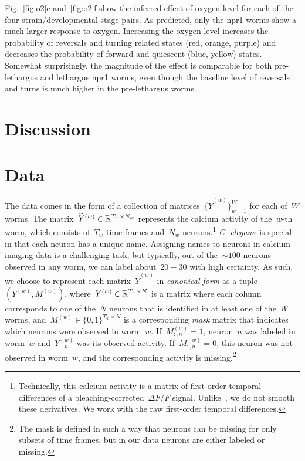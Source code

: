 \documentclass[11pt]{article}
\newcommand{\celegans}{\textit{C. elegans}}
\begin{document}
Fig.~\ref{fig:o2}e and~\ref{fig:o2}f show the inferred effect of
oxygen level for each of the four strain/developmental stage pairs.
As predicted, only the npr1 worms show a much larger response to
oxygen. Increasing the oxygen level increases the probability
of reversals and turning related states (red, orange, purple) and
decreases the probability of forward and quiescent (blue, yellow)
states. Somewhat surprisingly, the magnitude of the effect is
comparable for both pre-lethargus and lethargus npr1 worms, even
though the baseline level of reversals and turns is much higher in
the pre-lethargus worms. 

\clearpage

\section*{Discussion}

\clearpage




\clearpage

\appendix

\section{Data}
\label{sec:data}

The data comes in the form of a collection of matrices~$\{\widetilde{Y}^{(w)}\}_{w=1}^W$
for each of~$W$ worms.  The matrix~${\widetilde{Y}^{(w)} \in \mathbb{R}^{T_w \times N_w}}$
represents the calcium activity of the~$w$-th worm, which consists of~$T_w$
time frames and~$N_w$ neurons.\footnote{Technically, this calcium activity is
a matrix of first-order temporal differences of a
bleaching-corrected~$\Delta F /F$ signal. Unlike~\citet{kato2015global}, we
do not smooth these derivatives. We work with the raw first-order
temporal differences.}  \celegans~is special in that each neuron has a unique
name.  Assigning names to neurons in calcium imaging data is a challenging
task, but typically, out of the~${\sim 100}$ neurons observed in any worm,
we can label about~$20-30$ with high certainty.  As such, we choose to
represent each matrix~$\widetilde{Y}^{(w)}$ in \emph{canonical form} as a
tuple~$(Y^{(w)}, M^{(w)})$, where~${Y^{(w)} \in \mathbb{R}^{T_w \times N}}$ is
a matrix where each column corresponds to one of the~$N$ neurons that is
identified in at least one of the~$W$ worms, and~${M^{(w)} \in \{0,1\}^{T_w \times N}}$
is a corresponding \emph{mask} matrix that indicates which neurons were
observed in worm~$w$.  If~$M_{:,n}^{(w)} = 1$, neuron~$n$ was labeled in
worm~$w$ and~$Y_{:,n}^{(w)}$ was its observed activity.  If~$M_{:,n}^{(w)}=0$,
this neuron was not observed in worm~$w$, and the corresponding activity
is missing.\footnote{The mask is defined in such a way that neurons can
  be missing for only subsets of time frames, but in our data neurons are
  either labeled or missing.}
\end{document}
